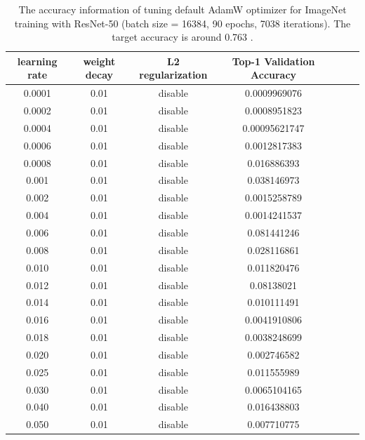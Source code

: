 \begin{table}[ht]
\renewcommand{\arraystretch}{1.3}
\caption{The accuracy information of tuning default AdamW optimizer for ImageNet training with ResNet-50 (batch size = 16384, 90 epochs, 7038 iterations). The target accuracy is around 0.763 \citep{goyal2017accurate}.}
\centering
\begin{tabular}{|c|c|c|c|c|c|c|}
\hline
learning rate & weight decay & L2 regularization & Top-1 Validation Accuracy\\
\hline
\hline
0.0001 & 0.01 & disable & 0.0009969076 \\
\hline
0.0002 & 0.01 & disable & 0.0008951823 \\
\hline
0.0004 & 0.01 & disable & 0.00095621747 \\
\hline
0.0006 & 0.01 & disable & 0.0012817383 \\
\hline
0.0008 & 0.01 & disable & 0.016886393 \\
\hline
0.001 & 0.01 & disable & 0.038146973 \\
\hline
0.002 & 0.01 & disable & 0.0015258789 \\
\hline
0.004 & 0.01 & disable & 0.0014241537 \\
\hline
0.006 & 0.01 & disable & 0.081441246 \\
\hline
0.008 & 0.01 & disable & 0.028116861 \\
\hline
0.010 & 0.01 & disable & 0.011820476 \\
\hline
0.012 & 0.01 & disable & 0.08138021 \\
\hline
0.014 & 0.01 & disable & 0.010111491 \\
\hline
0.016 & 0.01 & disable & 0.0041910806 \\
\hline
0.018 & 0.01 & disable & 0.0038248699 \\
\hline
0.020 & 0.01 & disable & 0.002746582 \\
\hline
0.025 & 0.01 & disable & 0.011555989 \\
\hline
0.030 & 0.01 & disable & 0.0065104165 \\
\hline
0.040 & 0.01 & disable & 0.016438803 \\
\hline
0.050 & 0.01 & disable & 0.007710775 \\
\hline
\end{tabular}
\label{table:imagenet_adamw_default_4}
\end{table}

